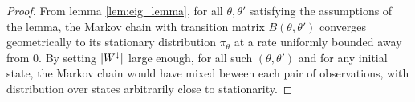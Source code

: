   \begin{proof}
%
{From lemma \ref{lem:eig_lemma}, for all $\theta, \theta'$ satisfying 
 the assumptions of the lemma, 
 the Markov chain with transition matrix $B(\theta, \theta')$ converges geometrically to its stationary distribution $\pi_\theta$ at 
 a rate uniformly bounded away from 0.
}
By setting ${|W^\downarrow}|$ large enough, for all such $(\theta,\theta')$ and for 
any initial state, the Markov chain would have mixed beween each pair of
observations, with distribution over states arbitrarily 
close to stationarity.





\end{proof}
